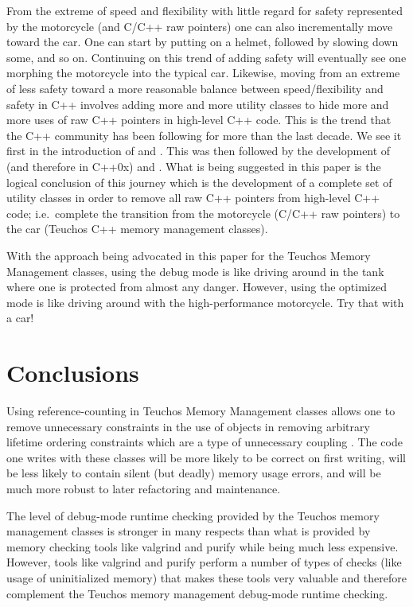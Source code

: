 \documentclass[pdf,ps2pdf,11pt]{SANDreport}
\begin{document}
From the extreme of speed and flexibility with little regard for
safety represented by the motorcycle (and C/C++ raw pointers) one can
also incrementally move toward the car.  One can start by putting on a
helmet, followed by slowing down some, and so on.  Continuing on this
trend of adding safety will eventually see one morphing the motorcycle
into the typical car.  Likewise, moving from an extreme of less safety
toward a more reasonable balance between speed/flexibility and safety
in C++ involves adding more and more utility classes to hide more and
more uses of raw C++ pointers in high-level C++ code.  This is the
trend that the C++ community has been following for more than the last
decade.  We see it first in the introduction of {}
and {}.  This was then followed by the development of
{} (and therefore {} in
C++0x) and {}.  What is being suggested in this
paper is the logical conclusion of this journey which is the
development of a complete set of utility classes in order to remove
all raw C++ pointers from high-level C++ code; i.e.\ complete the
transition from the motorcycle (C/C++ raw pointers) to the car
(Teuchos C++ memory management classes).

With the approach being advocated in this paper for the Teuchos Memory
Management classes, using the debug mode is like driving around in the
tank where one is protected from almost any danger.  However, using
the optimized mode is like driving around with the high-performance
motorcycle.  Try that with a car!


%
{}\section{Conclusions}
\label{sec:conclusions}
%

Using reference-counting in Teuchos Memory Management classes allows
one to remove unnecessary constraints in the use of objects in
removing arbitrary lifetime ordering constraints which are a type of
unnecessary coupling {}\cite{CodeComplete2nd04}.  The code one writes
with these classes will be more likely to be correct on first writing,
will be less likely to contain silent (but deadly) memory usage
errors, and will be much more robust to later refactoring and
maintenance.

The level of debug-mode runtime checking provided by the Teuchos
memory management classes is stronger in many respects than what is
provided by memory checking tools like valgrind and purify while being
much less expensive.  However, tools like valgrind and purify perform
a number of types of checks (like usage of uninitialized memory) that
makes these tools very valuable and therefore complement the Teuchos
memory management debug-mode runtime checking.
\end{document}

